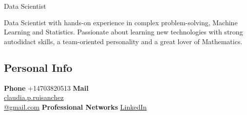 \documentclass[]{friggeri-cv}
\begin{document}
      {Data Scientist}
      
 Data Scientist  with  hands-on experience in complex problem-solving, Machine Learning and Statistics.  Passionate about learning new technologies with strong autodidact skills,  a team-oriented personality and a great lover of Mathematics. 


\begin{aside}
  \section{Personal Info}
  \textbf{Phone} +14703820513
  \textbf{Mail} \\\href{mailto:claudia.p.ruisanchez@gmail.com}{claudia.p.ruisanchez\\@gmail.com}
   \textbf{Professional Networks}
    \href{https://www.linkedin.com/in/claudiaperezruisanchez/}{LinkedIn}

\end{aside}
\end{document}
